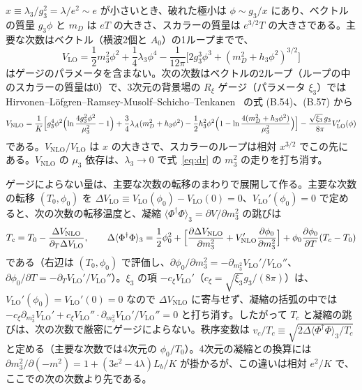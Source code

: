 \documentclass[a4paper,10pt]{ltjsarticle}
\begin{document}
$x\equiv\lambda_3/g_3^2=\lambda/e^2\sim e$ が小さいとき、破れた極小は $\phi\sim g_3/x$ にあり、ベクトルの質量 $g_3\phi$ と $m_D$ は $eT$ の大きさ、スカラーの質量は $e^{3/2}T$ の大きさである。主要な次数はベクトル（横波2個と $A_0$）の1ループまでで、
\begin{equation}
V_{\mathrm{LO}}=\frac12m_3^2\phi^2+\frac14\lambda_3\phi^4-\frac1{12\pi}\bigl[2g_3^3\phi^3+(m_D^2+h_3\phi^2)^{3/2}\bigr]
\label{eq:vlo3}
\end{equation}
はゲージのパラメータを含まない。次の次数はベクトルの2ループ（ループの中のスカラーの質量は0）で、3次元の背景場の $R_\xi$ ゲージ（パラメータ $\xi_3$）では Hirvonen--Löfgren--Ramsey-Musolf--Schicho--Tenkanen~\cite{hlrst22} の式 (B.54)、(B.57) から
\begin{equation}
V_{\mathrm{NLO}}=\frac1K\Bigl[g_3^4\phi^2\Bigl(\ln\frac{4g_3^2\phi^2}{\mu_3^2}-1\Bigr)+\frac34\lambda_A(m_D^2+h_3\phi^2)-\frac12h_3^2\phi^2\Bigl(1-\ln\frac{4(m_D^2+h_3\phi^2)}{\mu_3^2}\Bigr)\Bigr]-\frac{\sqrt{\xi_3}\,g_3}{8\pi}V_{\mathrm{LO}}'(\phi)
\label{eq:vnlo3}
\end{equation}
である。$V_{\mathrm{NLO}}/V_{\mathrm{LO}}$ は $x$ の大きさで、スカラーのループは相対 $x^{3/2}$ でこの先にある。$V_{\mathrm{NLO}}$ の $\mu_3$ 依存は、$\lambda_3\to0$ で式~\eqref{eq:dr} の $m_3^2$ の走りを打ち消す。

ゲージによらない量は、主要な次数の転移のまわりで展開して作る。主要な次数の転移 $(T_0,\phi_0)$ を $\Delta V_{\mathrm{LO}}\equiv V_{\mathrm{LO}}(\phi_0)-V_{\mathrm{LO}}(0)=0$、$V_{\mathrm{LO}}'(\phi_0)=0$ で定めると、次の次数の転移温度と、凝縮 $\langle\Phi^\dagger\Phi\rangle_3=\partial V/\partial m_3^2$ の跳びは
\begin{equation}
T_c=T_0-\frac{\Delta V_{\mathrm{NLO}}}{\partial_T\Delta V_{\mathrm{LO}}},\qquad
\Delta\langle\Phi^\dagger\Phi\rangle_3=\frac12\phi_0^2+\Bigl[\frac{\partial\Delta V_{\mathrm{NLO}}}{\partial m_3^2}+V_{\mathrm{NLO}}'\frac{\partial\phi_0}{\partial m_3^2}\Bigr]+\phi_0\frac{\partial\phi_0}{\partial T}(T_c-T_0)
\label{eq:strict}
\end{equation}
である（右辺は $(T_0,\phi_0)$ で評価し、$\partial\phi_0/\partial m_3^2=-\partial_{m_3^2}V_{\mathrm{LO}}'/V_{\mathrm{LO}}''$、$\partial\phi_0/\partial T=-\partial_TV_{\mathrm{LO}}'/V_{\mathrm{LO}}''$）。$\xi_3$ の項 $-c_\xi V_{\mathrm{LO}}'$（$c_\xi=\sqrt{\xi_3}g_3/(8\pi)$）は、$V_{\mathrm{LO}}'(\phi_0)=V_{\mathrm{LO}}'(0)=0$ なので $\Delta V_{\mathrm{NLO}}$ に寄与せず、凝縮の括弧の中では $-c_\xi\partial_{m_3^2}V_{\mathrm{LO}}'+c_\xi V_{\mathrm{LO}}''\cdot\partial_{m_3^2}V_{\mathrm{LO}}'/V_{\mathrm{LO}}''=0$ と打ち消す。したがって $T_c$ と凝縮の跳びは、次の次数で厳密にゲージによらない。秩序変数は $v_c/T_c\equiv\sqrt{2\Delta\langle\Phi^\dagger\Phi\rangle_3/T_c}$ と定める（主要な次数では4次元の $\phi_0/T_0$）。4次元の凝縮との換算には $\partial m_3^2/\partial(-m^2)=1+(3e^2-4\lambda)L_b/K$ が掛かるが、この違いは相対 $e^2/K$ で、ここでの次の次数より先である。
\end{document}

